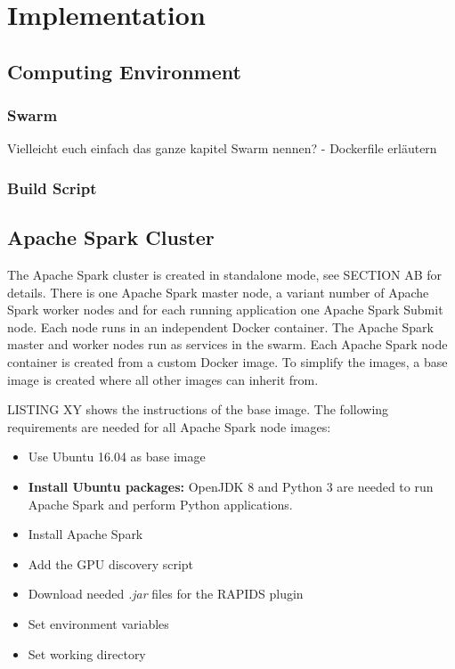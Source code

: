 \chapter{Implementation}
\label{sec:06_implementation}


\section{Computing Environment}


\subsection{Swarm}
Vielleicht euch einfach das ganze kapitel Swarm nennen?
- Dockerfile erläutern


\subsection{Build Script}


\section{Apache Spark Cluster}
The Apache Spark cluster is created in standalone mode, see SECTION AB for details. There is one Apache Spark master node, a variant number of Apache Spark worker nodes and for each running application one Apache Spark Submit node. Each node runs in an independent Docker container. The Apache Spark master and worker nodes run as services in the swarm. Each Apache Spark node container is created from a custom Docker image. To simplify the images, a base image is created where all other images can inherit from.

LISTING XY shows the instructions of the base image. The following requirements are needed for all Apache Spark node images:
\begin{itemize}
\item Use Ubuntu 16.04 as base image
\item \textbf{Install Ubuntu packages:} OpenJDK 8 and Python 3 are needed to run Apache Spark and perform Python applications.
\item Install Apache Spark
\item Add the GPU discovery script
\item Download needed \textit{.jar} files for the RAPIDS plugin
\item Set environment variables
\item Set working directory
\end{itemize}


